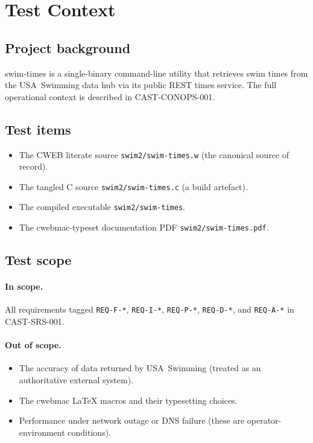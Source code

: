 \documentclass[12pt]{article}
\newcommand{\code}[1]{\texttt{#1}}
\newcommand{\req}[1]{\texttt{#1}}
\begin{document}
\section{Test Context}

\subsection{Project background}

swim-times is a single-binary command-line utility that retrieves
swim times from the USA~Swimming data hub via its public REST times service.
The full operational context is described in CAST-CONOPS-001.

\subsection{Test items}

\begin{itemize}
  \item The CWEB literate source \code{swim2/swim-times.w} (the
        canonical source of record).
  \item The tangled C source \code{swim2/swim-times.c} (a build
        artefact).
  \item The compiled executable \code{swim2/swim-times}.
  \item The cwebmac-typeset documentation PDF
        \code{swim2/swim-times.pdf}.
\end{itemize}

\subsection{Test scope}

\paragraph{In scope.}
All requirements tagged \req{REQ-F-*}, \req{REQ-I-*}, \req{REQ-P-*},
\req{REQ-D-*}, and \req{REQ-A-*} in CAST-SRS-001.

\paragraph{Out of scope.}
\begin{itemize}
  \item The accuracy of data returned by USA~Swimming (treated as
        an authoritative external system).
  \item The cwebmac LaTeX macros and their typesetting choices.
  \item Performance under network outage or DNS failure (these
        are operator-environment conditions).
\end{itemize}
\end{document}
